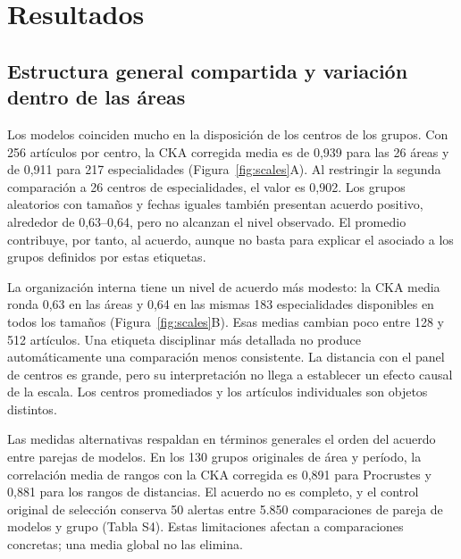 \documentclass[12pt]{article}
\begin{document}
\section{Resultados}
\subsection{Estructura general compartida y variación dentro de las áreas}
Los modelos coinciden mucho en la disposición de los centros de los grupos. Con 256 artículos por centro, la CKA corregida media es de 0,939 para las 26 áreas y de 0,911 para 217 especialidades (Figura~\ref{fig:scales}A). Al restringir la segunda comparación a 26 centros de especialidades, el valor es 0,902. Los grupos aleatorios con tamaños y fechas iguales también presentan acuerdo positivo, alrededor de 0,63--0,64, pero no alcanzan el nivel observado. El promedio contribuye, por tanto, al acuerdo, aunque no basta para explicar el asociado a los grupos definidos por estas etiquetas.

La organización interna tiene un nivel de acuerdo más modesto: la CKA media ronda 0,63 en las áreas y 0,64 en las mismas 183 especialidades disponibles en todos los tamaños (Figura~\ref{fig:scales}B). Esas medias cambian poco entre 128 y 512 artículos. Una etiqueta disciplinar más detallada no produce automáticamente una comparación menos consistente. La distancia con el panel de centros es grande, pero su interpretación no llega a establecer un efecto causal de la escala. Los centros promediados y los artículos individuales son objetos distintos.

Las medidas alternativas respaldan en términos generales el orden del acuerdo entre parejas de modelos. En los 130 grupos originales de área y período, la correlación media de rangos con la CKA corregida es 0,891 para Procrustes y 0,881 para los rangos de distancias. El acuerdo no es completo, y el control original de selección conserva 50 alertas entre 5.850 comparaciones de pareja de modelos y grupo (Tabla S4). Estas limitaciones afectan a comparaciones concretas; una media global no las elimina.
\end{document}
